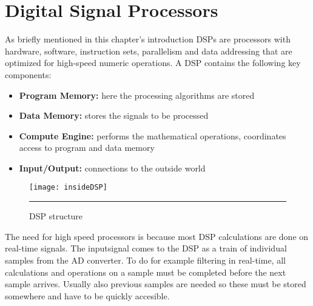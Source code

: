 \section{Digital Signal Processors}
As briefly mentioned in this chapter's introduction DSPs are processors with hardware, software, instruction sets, parallelism and data addressing that are optimized for high-speed numeric operations. 
A DSP contains the following key components:
\begin{itemize}
\item \textbf{Program Memory:} here the processing algorithms are stored
\item \textbf{Data Memory:} stores the signals to be processed
\item \textbf{Compute Engine:} performs the mathematical operations, coordinates access to program and data memory
\item \textbf{Input/Output:} connections to the outside world
\end{itemize}
\begin{figure}[htbp]
\centering
\texttt{[image: insideDSP]}
\rule{30em}{0.5pt}
\caption[Structere of a DSP]{DSP structure}
\label{fig:insideDSP}
\end{figure} 
The need for high speed processors is because most DSP calculations are done on real-time signals. The inputsignal comes to the DSP as a train of individual samples from the AD converter. To do for example filtering in real-time, all calculations and operations on a sample must be completed before the next sample arrives. Usually also previous samples are needed so these must be stored somewhere and have to be quickly accesible. \\ 
